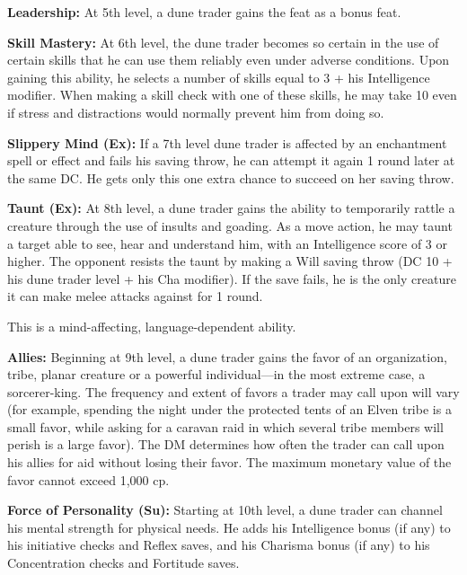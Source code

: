 {\textbf{Leadership:} At 5th level, a dune trader gains the  feat as a bonus feat.

\textbf{Skill Mastery:} At 6th level, the dune trader becomes so certain in the use of certain skills that he can use them reliably even under adverse conditions. Upon gaining this ability, he selects a number of skills equal to 3 + his Intelligence modifier. When making a skill check with one of these skills, he may take 10 even if stress and distractions would normally prevent him from doing so.

\textbf{Slippery Mind (Ex):} If a 7th level dune trader is affected by an enchantment spell or effect and fails his saving throw, he can attempt it again 1 round later at the same DC. He gets only this one extra chance to succeed on her saving throw.

\textbf{Taunt (Ex):} At 8th level, a dune trader gains the ability to temporarily rattle a creature through the use of insults and goading. As a move action, he may taunt a target able to see, hear and understand him, with an Intelligence score of 3 or higher. The opponent resists the taunt by making a Will saving throw (DC 10 + his dune trader level + his Cha modifier). If the save fails, he is the only creature it can make melee attacks against for 1 round.

This is a mind-affecting, language-dependent ability.

\textbf{Allies:} Beginning at 9th level, a dune trader gains the favor of an organization, tribe, planar creature or a powerful individual---in the most extreme case, a sorcerer-king. The frequency and extent of favors a trader may call upon will vary (for example, spending the night under the protected tents of an Elven tribe is a small favor, while asking for a caravan raid in which several tribe members will perish is a large favor). The DM determines how often the trader can call upon his allies for aid without losing their favor. The maximum monetary value of the favor cannot exceed 1,000 cp.

\textbf{Force of Personality (Su):} Starting at 10th level, a dune trader can channel his mental strength for physical needs. He adds his Intelligence bonus (if any) to his initiative checks and Reflex saves, and his Charisma bonus (if any) to his Concentration checks and Fortitude saves.
}

